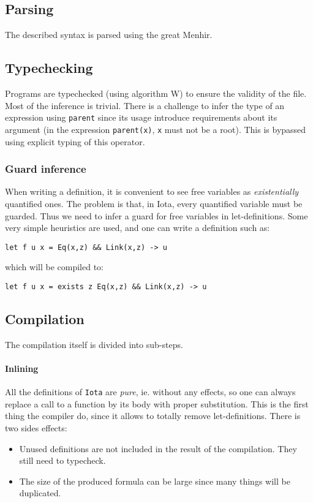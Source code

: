 \documentclass[10pt,a4paper]{article}
\newcommand{\ocaml}{\texttt}
\begin{document}
\subsection{Parsing}
The described syntax is parsed using the great Menhir\cite{menhir}.

\subsection{Typechecking}
Programs are typechecked (using algorithm W) to ensure the validity of the file. Most of the inference is trivial. There is a challenge to infer the type of an expression using \ocaml{parent} since its usage introduce requirements about its argument (in the expression \ocaml{parent(x)}, \ocaml{x} must not be a root). This is bypassed using explicit typing of this operator.

\subsubsection{Guard inference}
\label{subsubsec:guardinfer}
When writing a definition, it is convenient to see free variables as \emph{existentially} quantified ones. The problem is that, in Iota, every quantified variable must be guarded. Thus we need to infer a guard for free variables in let-definitions. Some very simple heuristics are used, and one can write a definition such as:
\begin{verbatim}
let f u x = Eq(x,z) && Link(x,z) -> u
\end{verbatim}
which will be compiled to:
\begin{verbatim}
let f u x = exists z Eq(x,z) && Link(x,z) -> u
\end{verbatim}
\subsection{Compilation}
The compilation itself is divided into sub-steps.

\paragraph{Inlining}
All the definitions of \verb|Iota| are \emph{pure}, ie. without any effects, so one can always replace a call to a function by its body with proper substitution. This is the first thing the compiler do, since it allows to totally remove let-definitions. There is two sides effects:

\begin{itemize}
\item Unused definitions are not included in the result of the compilation. They still need to typecheck.
\item The size of the produced formula can be large since many things will be duplicated.
\end{itemize}
\end{document}
